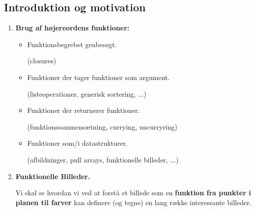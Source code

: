 \documentclass[rgb]{beamer}
\begin{document}
\popmaketitleframe

\renewcommand{\sp}{\vspace{1ex}}
\newcommand{\shead}[1]{\vspace{1ex}\head{#1}\vspace{1ex}}


\subsection{Introduktion og motivation}
\begin{frame}[fragile]
\begin{footnotesize}


  \vspace{1ex}

  \begin{minipage}{.75\textwidth}
  \begin{enumerate}
  \item \textbf{Brug af højereordens funktioner:}

    \begin{itemize}
    \item Funktionsbegrebet genbesøgt.

      (closures)
    \item Funktioner der tager funktioner som argument.

      (listeoperationer, generisk sortering, ...)

    \item Funktioner der returnerer funktioner.

      (funktionssammensætning, currying, uncurryring)

    \item Funktioner som/i datastrukturer.

      (afbildninger, pull arrays, funktionelle billeder, ...)

    \end{itemize}

  \item \textbf{Funktionelle Billeder.}

    Vi skal se hvordan vi ved at forstå et billede som en \textbf{funktion fra
    punkter i planen til farver} kan definere (og tegne) en lang række interessante billeder.


\end{enumerate}
\end{minipage}
\end{footnotesize}
\end{frame}
\end{document}
